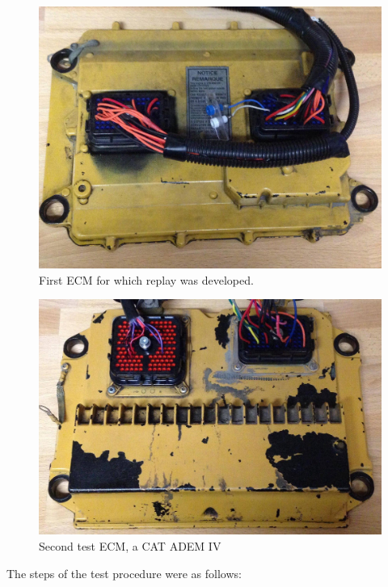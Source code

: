 \begin{figure}[h]
  \centering
  \includegraphics[scale=.2]{cat-ecm-1}
  \caption{First ECM for which replay was developed.}
  \label{fig:cat-ecm-1}
\end{figure}

\begin{figure}[h]
  \centering
  \includegraphics[scale=.2]{cat-ecm-2}
  \caption{Second test ECM, a CAT ADEM IV}
  \label{fig:cat-ecm-2}
\end{figure}


The steps of the test procedure were as follows:

